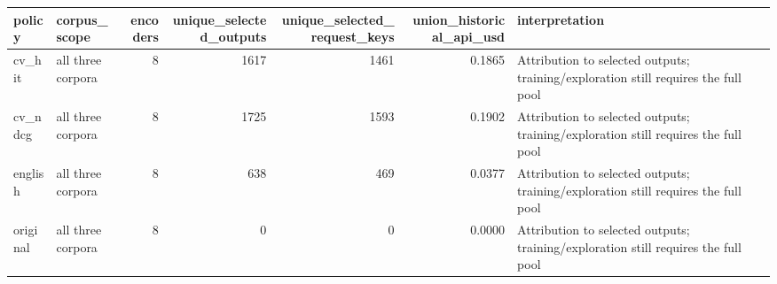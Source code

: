 \begin{tabular}{llrrrrl}
\toprule
policy & corpus\_scope & encoders & unique\_selected\_outputs & unique\_selected\_request\_keys & union\_historical\_api\_usd & interpretation \\
\midrule
cv\_hit & all three corpora & 8 & 1617 & 1461 & 0.1865 & Attribution to selected outputs; training/exploration still requires the full pool \\
cv\_ndcg & all three corpora & 8 & 1725 & 1593 & 0.1902 & Attribution to selected outputs; training/exploration still requires the full pool \\
english & all three corpora & 8 & 638 & 469 & 0.0377 & Attribution to selected outputs; training/exploration still requires the full pool \\
original & all three corpora & 8 & 0 & 0 & 0.0000 & Attribution to selected outputs; training/exploration still requires the full pool \\
\bottomrule
\end{tabular}

